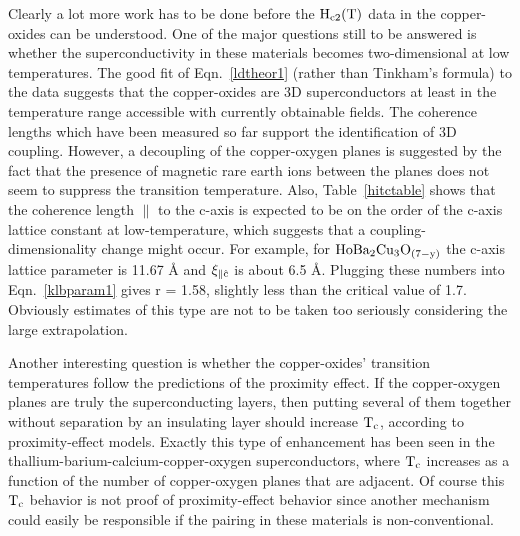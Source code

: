 \begin{table}
\begin{center}
\end{center}
\end{table}

        Clearly a lot more work has  to be done  before the $\rm H_{c2}(T)$
data in  the copper-oxides can be understood.   One  of the major questions
still to be answered  is whether the  superconductivity in  these materials
becomes    two-dimensional  at   low temperatures.    The  good  fit     of
Eqn.~\ref{ldtheor1} (rather than  Tinkham's formula)  to the  data suggests
that the copper-oxides are 3D superconductors  at least  in the temperature
range accessible  with currently obtainable fields.  The  coherence lengths
which  have been measured    so   far support  the   identification   of 3D
coupling.\cite{worthington87}  However, a decoupling  of the  copper-oxygen
planes is suggested by the  fact that the  presence of  magnetic rare earth
ions between   the  planes  does    not seem to   suppress  the  transition
temperature.\cite{tamegai87,orlando87}  Also,  Table~\ref{hitctable}  shows
that the coherence length  $\parallel$ to the  c-axis is expected to  be on
the order of the c-axis lattice constant at low-temperature, which suggests
that a coupling-dimensionality  change might occur.  For  example, for $\rm
HoBa_2Cu_3O_{(7-y)}$ the c-axis lattice parameter is 11.67
\AA\cite{tamegai87} and $\rm
\xi_{\parallel \hat{c}}$ is about 6.5 \AA.  Plugging these numbers into
Eqn.~\ref{klbparam1} gives r = 1.58, slightly less  than the critical value
of 1.7.  Obviously estimates of this type are not to be taken too seriously
considering the large extrapolation.

        Another  interesting   question  is   whether  the   copper-oxides'
transition temperatures follow the predictions of the proximity effect.  If
the copper-oxygen planes are truly the superconducting layers,  then putting
several of  them together without separation by  an insulating layer should
increase $\rm T_c$,  according to  proximity-effect  models.   Exactly this
type        of      enhancement     has         been      seen      in  the
thallium-barium-calcium-copper-oxygen   superconductors,  where   $\rm T_c$
increases as  a  func\-tion of the  num\-ber of copp\-er-ox\-y\-gen   planes that are
ad\-ja\-cent.\cite{pool88} Of  course this $\rm  T_c$ behavior is  not proof of
proximity-effect  behavior    since   another mechanism    could  easily be
responsible if the pairing in these materials is non-conventional.

